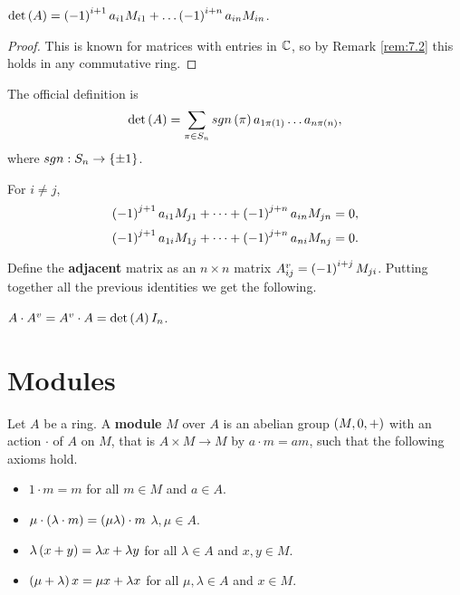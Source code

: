 \begin{proposition}
$ \det\left( A \right) = \left( -1 \right)^{i + 1}a_{i1}M_{i1} + \dots \left( -1 \right)^{i + n}a_{in}M_{in} $.
\end{proposition}

\begin{proof}
This is known for matrices with entries in $ \mathbb{C} $, so by Remark \ref{rem:7.2} this holds in any commutative ring.
\end{proof}

\begin{remark}
The official definition is
$$ \det\left( A \right) = \sum_{\pi \in S_n} sgn\left( \pi \right)a_{1\pi\left( 1 \right)} \dots a_{n\pi\left( n \right)}, $$
where $ sgn : S_n \to \left\{ \pm 1 \right\} $.
\end{remark}

\begin{proposition}
For $ i \ne j $,
$$ \left( -1 \right)^{j + 1}a_{i1}M_{j1} + \dots + \left( -1 \right)^{j + n}a_{in}M_{jn} = 0, $$
$$ \left( -1 \right)^{j + 1}a_{1i}M_{1j} + \dots + \left( -1 \right)^{j + n}a_{ni}M_{nj} = 0. $$
\end{proposition}

Define the \textbf{adjacent} matrix as an $ n \times n $ matrix $ A^v_{ij} = \left( -1 \right)^{i + j}M_{ji} $. Putting together all the previous identities we get the following.

\begin{theorem}
$ A \cdot A^v = A^v \cdot A = \det\left( A \right) I_n $.
\end{theorem}

\pagebreak

\section{Modules}


\begin{definition}
Let $ A $ be a ring. A \textbf{module} $ M $ over $ A $ is an abelian group $ \left( M, 0, + \right) $ with an action $ \cdot $ of $ A $ on $ M $, that is $ A \times M \to M $ by $ a \cdot m = am $, such that the following axioms hold.
\begin{itemize}
\item $ 1 \cdot m = m $ for all $ m \in M $ and $ a \in A $.
\item $ \mu \cdot \left( \lambda \cdot m \right) = \left( \mu\lambda \right) \cdot m $ $ \lambda, \mu \in A $.
\item $ \lambda\left( x + y \right) = \lambda x + \lambda y $ for all $ \lambda \in A $ and $ x, y \in M $.
\item $ \left( \mu + \lambda \right)x = \mu x + \lambda x $ for all $ \mu, \lambda \in A $ and $ x \in M $.
\end{itemize}
\end{definition}

